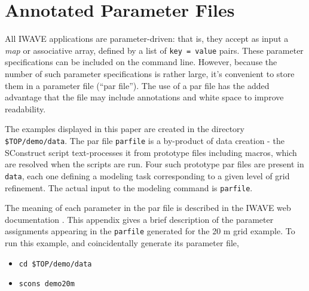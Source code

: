 \appendix
\section{Annotated Parameter Files}

All IWAVE applications are parameter-driven: that is, they accept as
input a {\em map} or associative array, defined by 
a list of {\tt key = value} pairs. These parameter specifications can
be included on the command line. However, because the number of such
parameter specifications is rather large, it's convenient to store
them in a parameter file (``par file''). The use of a par file has the
added advantage that the file may include annotations and white space to
improve readability. 

The examples displayed in this paper are created in the directory {\tt
  \$TOP/demo/data}. The par file {\tt parfile} is a by-product of data
creation - the SConstruct script text-processes it from prototype
files including macros, which are resolved when the scripts are
run. Four such prototype par files are present in {\tt data}, each one defining
a modeling task corresponding to a given level of grid refinement. 
The actual input to the modeling command is {\tt parfile}. 

The meaning of each parameter in the par file is described in the IWAVE
web documentation \cite[]{IWAVE}.
This appendix gives a brief description of the parameter assignments
appearing in the {\tt parfile} generated for the 20 m grid example. To
run this example, and coincidentally generate its parameter file,
\begin{itemize}
\item {\tt cd \$TOP/demo/data}
\item {\tt scons demo20m}
\end{itemize}

